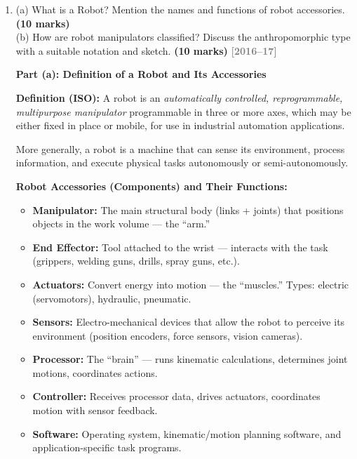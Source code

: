 \documentclass[12pt,a3paper]{article}
\newcommand{\yr}[1]{\hfill\textcolor{gray}{\small\textbf{[#1]}}}
\newcommand{\mk}[1]{\textcolor{orange!70!black}{\small\textbf{(#1 marks)}}}
\begin{document}
\begin{enumerate}
\begin{tcolorbox}[enhanced,breakable,ansbox,colback=cA!4,colframe=cA,
  boxrule=0.8pt,arc=5pt,
  title={\textbf{Answer}},fonttitle=\bfseries\color{white},colbacktitle=cA]
\end{tcolorbox}

\item \label{qlabel:C1-Q4}
(a) What is a Robot? Mention the names and functions of robot accessories. \mk{10}\\
(b) How are robot manipulators classified? Discuss the anthropomorphic type with a suitable notation and sketch. \mk{10}
\yr{2016--17}

\begin{tcolorbox}[enhanced,breakable,ansbox,colback=cA!4,colframe=cA,
  boxrule=0.8pt,arc=5pt,
  title={\textbf{Answer}},fonttitle=\bfseries\color{white},colbacktitle=cA]

\textbf{Part (a): Definition of a Robot and Its Accessories}

\textbf{Definition (ISO):} A robot is an \emph{automatically controlled,
reprogrammable, multipurpose manipulator} programmable in three or more axes,
which may be either fixed in place or mobile, for use in industrial automation
applications.

More generally, a robot is a machine that can sense its environment, process
information, and execute physical tasks autonomously or semi-autonomously.

\textbf{Robot Accessories (Components) and Their Functions:}

\begin{itemize}[leftmargin=1.5em,itemsep=2pt]
  \item \textbf{Manipulator:} The main structural body (links + joints) that
        positions objects in the work volume — the ``arm.''
  \item \textbf{End Effector:} Tool attached to the wrist — interacts with the
        task (grippers, welding guns, drills, spray guns, etc.).
  \item \textbf{Actuators:} Convert energy into motion — the ``muscles.''
        Types: electric (servomotors), hydraulic, pneumatic.
  \item \textbf{Sensors:} Electro-mechanical devices that allow the robot to
        perceive its environment (position encoders, force sensors, vision
        cameras).
  \item \textbf{Processor:} The ``brain'' — runs kinematic calculations,
        determines joint motions, coordinates actions.
  \item \textbf{Controller:} Receives processor data, drives actuators,
        coordinates motion with sensor feedback.
  \item \textbf{Software:} Operating system, kinematic/motion planning
        software, and application-specific task programs.
\end{itemize}


\end{tcolorbox}
\end{enumerate}
\end{document}

